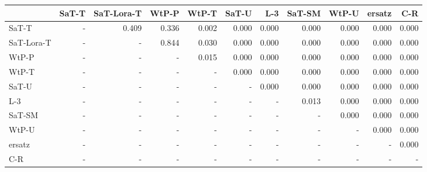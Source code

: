 \begin{tabular}{lrrrrrrrrrr}
\toprule
 & SaT-T & SaT-Lora-T & WtP-P & WtP-T & SaT-U & L-3 & SaT-SM & WtP-U & ersatz & C-R \\
\midrule
SaT-T & - & 0.409 & 0.336 & 0.002 & 0.000 & 0.000 & 0.000 & 0.000 & 0.000 & 0.000 \\
SaT-Lora-T & - & - & 0.844 & 0.030 & 0.000 & 0.000 & 0.000 & 0.000 & 0.000 & 0.000 \\
WtP-P & - & - & - & 0.015 & 0.000 & 0.000 & 0.000 & 0.000 & 0.000 & 0.000 \\
WtP-T & - & - & - & - & 0.000 & 0.000 & 0.000 & 0.000 & 0.000 & 0.000 \\
SaT-U & - & - & - & - & - & 0.000 & 0.000 & 0.000 & 0.000 & 0.000 \\
L-3 & - & - & - & - & - & - & 0.013 & 0.000 & 0.000 & 0.000 \\
SaT-SM & - & - & - & - & - & - & - & 0.000 & 0.000 & 0.000 \\
WtP-U & - & - & - & - & - & - & - & - & 0.000 & 0.000 \\
ersatz & - & - & - & - & - & - & - & - & - & 0.000 \\
C-R & - & - & - & - & - & - & - & - & - & - \\
\bottomrule
\end{tabular}

